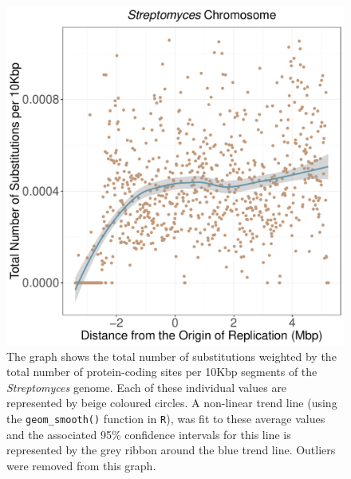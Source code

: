 \documentclass[11pt]{article}
\newcommand{\strep}{\textit{Streptomyces}\xspace}
\begin{document}
\begin{figure}[h]
	\begin{center}
		\includegraphics[width=\textwidth]{./figs/strep_10KB_weighted_subs_nonpar_14Nov20.pdf}
		\caption{\label{fig:strep_nonpar}The graph shows the total number of substitutions weighted by the total number of protein-coding sites per 10Kbp segments of the \strep genome. Each of these individual values are represented by beige coloured circles. A non-linear trend line (using the \texttt{geom\_smooth()} function in \texttt{R}), was fit to these average values and the associated 95\% confidence intervals for this line is represented by the grey ribbon around the blue trend line. Outliers were removed from this graph.}
	\end{center}
\end{figure}
\end{document}
